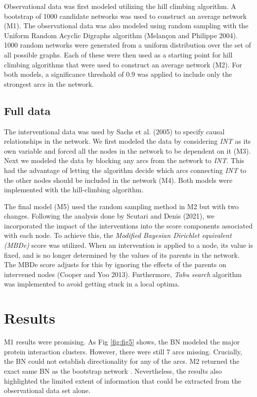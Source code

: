 \documentclass[twocol]{ametsoc}
\begin{document}
Observational data was first modeled utilizing the hill climbing
algorithm. A bootstrap of 1000 candidate networks was used to construct
an average network (M1). The observational data was also modeled using
random sampling with the Uniform Random Acyclic Digraphs algorithm
(Melançon and Philippe 2004). 1000 random networks were generated from a
uniform distribution over the set of all possible graphs. Each of these
were then used as a starting point for hill climbing algorithms that
were used to construct an average network (M2). For both models, a
significance threshold of 0.9 was applied to include only the strongest
arcs in the network.

\hypertarget{full-data}{%
\subsection{Full data}\label{full-data}}

The interventional data was used by Sachs et al. (2005) to specify
causal relationships in the network. We first modeled the data by
considering \emph{INT} as its own variable and forced all the nodes in
the network to be dependent on it (M3). Next we modeled the data by
blocking any arcs from the network to \emph{INT}. This had the advantage
of letting the algorithm decide which arcs connecting \emph{INT} to the
other nodes should be included in the network (M4). Both models were
implemented with the hill-climbing algorithm.

The final model (M5) used the random sampling method in M2 but with two
changes. Following the analysis done by Scutari and Denis (2021), we
incorporated the impact of the interventions into the score components
associated with each node. To achieve this, the \emph{Modified Bayesian
Dirichlet equivalent (MBDe)} score was utilized. When an intervention is
applied to a node, its value is fixed, and is no longer determined by
the values of its parents in the network. The MBDe score adjusts for
this by ignoring the effects of the parents on intervened nodes (Cooper
and Yoo 2013). Furthermore, \emph{Tabu search} algorithm was implemented
to avoid getting stuck in a local optima.

\hypertarget{results}{%
\section{Results}\label{results}}

M1 results were promising. As Fig \ref{fig:fig5} shows, the BN modeled
the major protein interaction clusters. However, there were still 7 arcs
missing. Crucially, the BN could not establish directionality for any of
the arcs. M2 returned the exact same BN as the bootstrap network .
Nevertheless, the results also highlighted the limited extent of
information that could be extracted from the observational data set
alone.
\end{document}
